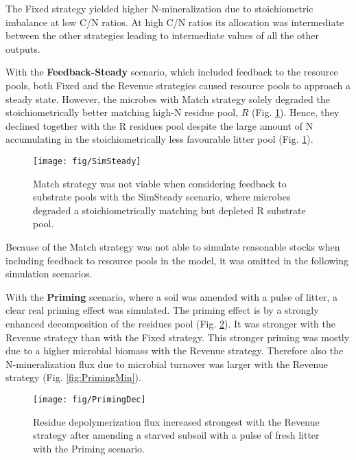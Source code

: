 The Fixed strategy yielded higher N-mineralization due to stoichiometric
imbalance at low C/N ratios.
At high C/N ratios its allocation was intermediate between the other strategies leading
to intermediate values of all the other outputs.


With the \textbf{Feedback-Steady} scenario, which included feedback to the
resource pools, both Fixed and the Revenue strategies caused
resource pools to approach a steady state.
However, the microbes with Match strategy solely degraded the
stoichiometrically better matching high-N residue pool, $R$ (Fig.
\ref{fig:SimSteady}). Hence, they declined together with the R residues
pool despite the large amount of N accumulating in the stoichiometrically less
favourable litter pool (Fig. \ref{fig:SimSteady}).

\begin{figure}[t]
\vspace*{2mm}
\begin{center} 
\texttt{[image: fig/SimSteady]} 
\end{center}
\caption{Match strategy was not viable when considering feedback to
substrate pools with the SimSteady scenario, where microbes degraded a
stoichiometrically matching but depleted R substrate pool.
\label{fig:SimSteady}} 
\end{figure}

Because of the Match strategy was not able to simulate reasonable
stocks when including feedback to resource pools in the model, it was omitted
in the following simulation scenarios.

With the \textbf{Priming} scenario, where a soil was amended with a pulse of
litter, a clear real priming effect was simulated.
The priming effect is by a strongly enhanced decomposition of the residues
pool (Fig. \ref{fig:PrimingDec}). It was stronger with the Revenue strategy than
with the Fixed strategy. This stronger priming was mostly due to a higher microbial
biomass with the Revenue strategy. Therefore also the N-mineralization flux due
to microbial turnover was larger with the Revenue strategy (Fig.
\ref{fig:PrimingMin}).

\begin{figure}[t]
\vspace*{2mm}
\begin{center}
\texttt{[image: fig/PrimingDec]}
\end{center}
\caption{Residue depolymerization flux increased strongest with the Revenue
strategy after amending a starved subsoil with a pulse of fresh litter with the
Priming scenario.
\label{fig:PrimingDec}}
\end{figure}

